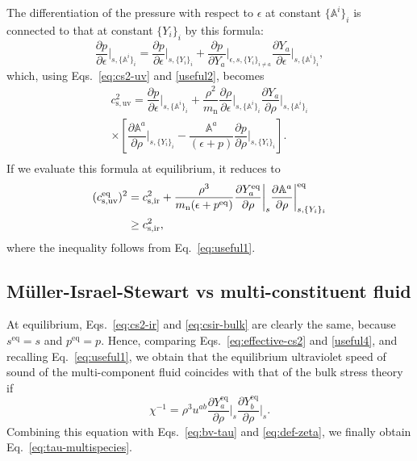 \documentclass[aps,prd,twocolumn,a4paper,floatfix,nofootbib,superscriptaddress,nofootinbib]{revtex4}
\newcommand{\rn}{\mathrm{n}}
\newcommand{\req}{\mathrm{eq}}
\begin{document}
The differentiation of the pressure with respect to $\epsilon$ at constant $\{\mathbb A^i\}_i$
is connected to that at constant $\{Y_i\}_i$ by this formula:
%
\begin{equation}
\dfrac{\partial p}{\partial \epsilon}\bigg|_{s,\{\mathbb{A}^i\}_i} = \dfrac{\partial
p}{\partial \epsilon}\bigg|_{s,\{Y_i\}_i} + \dfrac{\partial p}{\partial
Y_a}\bigg|_{\epsilon,s,\{ Y_i \}_{i\neq a}} \dfrac{\partial Y_a}{\partial
\epsilon}\bigg|_{s,\{\mathbb{A}^i\}_i},
\end{equation}
%
which, using Eqs.~\eqref{eq:cs2-uv} and \eqref{useful2}, becomes 
%
\begin{multline}
c_\mathrm{s,uv}^2 = \dfrac{\partial p}{\partial
\epsilon}\bigg|_{s,\{\mathbb{A}^i\}_i}+ 
\dfrac{\rho^2}{m_\rn}\dfrac{\partial \rho}{\partial
\epsilon}\bigg|_{s,\{\mathbb{A}^i\}_i} \dfrac{\partial Y_a}{\partial
\rho}\bigg|_{s,\{\mathbb{A}^i\}_i}\\
\times \left[ \dfrac{\partial \mathbb{A}^a}{\partial
\rho}\bigg|_{s,\{Y_i\}_i} \! \! \! \! - \dfrac{ \mathbb{A}^a}{
(\epsilon+p)}\dfrac{\partial p}{\partial \rho}\bigg|_{s,\{Y_i\}_i}  \right].\\
\end{multline}
%
If we evaluate this formula at equilibrium, it reduces to
\begin{align}
\label{useful4}
(c^\req_\mathrm{s,uv})^2 ={}& c_\mathrm{s,ir}^2 + \dfrac{\rho^3}{m_\rn
(\epsilon+p^\req)} \dfrac{\partial Y_a^\req}{\partial \rho}\bigg|_{s}
\dfrac{\partial \mathbb{A}^a}{\partial \rho}\bigg|_{s,\{Y_i\}_i}^\req\\
\geq{}& c_\mathrm{s,ir}^2,\notag
\end{align}
%
where the inequality follows from Eq.~\eqref{eq:useful1}.

\subsection{M\"uller-Israel-Stewart vs multi-constituent fluid}
\label{ssec:is-vs-mcf}

At equilibrium, Eqs.~\eqref{eq:cs2-ir} and \eqref{eq:csir-bulk} are clearly the
same, because $s^\req =s$ and $p^\req =p$. Hence, comparing
Eqs.~\eqref{eq:effective-cs2} and \eqref{useful4}, and recalling
Eq.~\eqref{eq:useful1}, we obtain that the equilibrium ultraviolet speed of
sound of the multi-component fluid coincides with that of the bulk
stress theory if
%
\begin{equation}
\chi^{-1} = \rho^3  u^{ab} \dfrac{\partial Y_a^\req}{\partial \rho} \bigg|_s \dfrac{\partial Y_b^\req}{\partial \rho} \bigg|_s .
\end{equation}
%
Combining this equation with Eqs.~\eqref{eq:bv-tau} and \eqref{eq:def-zeta}, we
finally obtain Eq.~\eqref{eq:tau-multispecies}.
\end{document}
